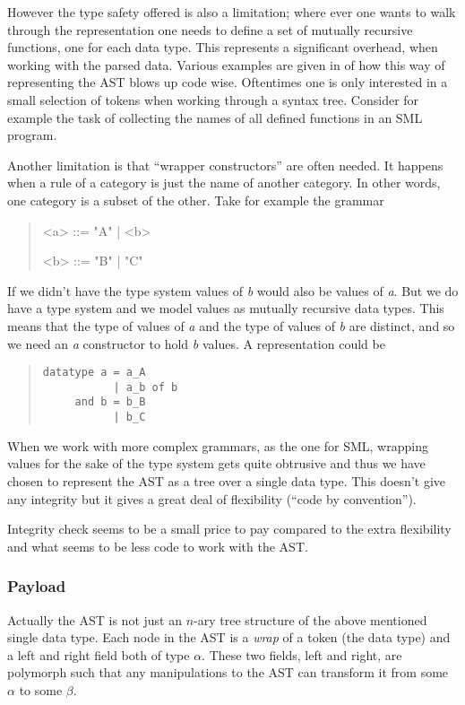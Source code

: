 However the type safety offered is also a limitation; where ever one wants to
walk through the representation one needs to define a set of mutually recursive
functions, one for each data type. This represents a significant overhead, when
working with the parsed data. Various examples are given in \cite{mbp08} of how
this way of representing the AST blows up code wise. Oftentimes one is only
interested in a small selection of tokens when working through a syntax
tree. Consider for example the task of collecting the names of all defined
functions in an SML program.


Another limitation is that ``wrapper constructors'' are often needed. It happens
when a rule of a category is just the name of another category. In other words,
one category is a subset of the other. Take for example the grammar

\setlength{\grammarindent}{3.5em} 
\begin{quote}
  \begin{grammar}
    <a> ::= "A" | <b>

    <b> ::= "B" | "C"
  \end{grammar}
\end{quote}


If we didn't have the type system values of \textit{b} would also be values of
\textit{a}. But we do have a type system and we model values as mutually
recursive data types. This means that the type of values of \textit{a} and the
type of values of \textit{b} are distinct, and so we need an \textit{a}
constructor to hold \textit{b} values. A representation could be

\begin{quote}
\begin{verbatim}
datatype a = a_A
           | a_b of b
     and b = b_B
           | b_C
\end{verbatim}
\end{quote}

When we work with more complex grammars, as the one for SML, wrapping values for
the sake of the type system gets quite obtrusive and thus we have chosen to
represent the AST as a tree over a single data type. This doesn't give any
integrity but it gives a great deal of flexibility (``code by
convention'').

Integrity check seems to be a small price to pay compared to the extra
flexibility and what seems to be less code to work with the AST.

\subsubsection{Payload}
Actually the AST is not just an $n$-ary tree structure of the above mentioned
single data type. Each node in the AST is a \textit{wrap} of a token (the data
type) and a left and right field both of type $\alpha$. These two fields, left
and right, are polymorph such that any manipulations to the AST can transform it
from some $\alpha$ to some $\beta$.

